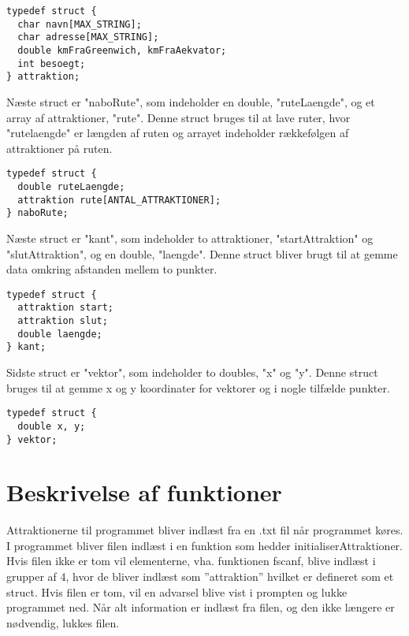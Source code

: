 \begin{lstlisting}
typedef struct {
  char navn[MAX_STRING];
  char adresse[MAX_STRING]; 
  double kmFraGreenwich, kmFraAekvator;
  int besoegt;
} attraktion;
\end{lstlisting} 

Næste struct er "naboRute", som indeholder en double, "ruteLaengde", og et array af attraktioner, "rute". Denne struct bruges til at lave ruter, hvor "rutelaengde" er længden af ruten og arrayet indeholder rækkefølgen af attraktioner på ruten. \newline

\begin{lstlisting}
typedef struct {
  double ruteLaengde;
  attraktion rute[ANTAL_ATTRAKTIONER];
} naboRute;
\end{lstlisting}

Næste struct er "kant", som indeholder to attraktioner, "startAttraktion" og "slutAttraktion", og en double, "laengde". Denne struct bliver brugt til at gemme data omkring afstanden mellem to punkter.\newline

\begin{lstlisting}
typedef struct {
  attraktion start;
  attraktion slut;
  double laengde;
} kant;
\end{lstlisting}

Sidste struct er "vektor", som indeholder to doubles, "x" og "y". Denne struct bruges til at gemme x og y koordinater for vektorer og i nogle tilfælde punkter. \newline

\begin{lstlisting}
typedef struct {
  double x, y;
} vektor;
\end{lstlisting}

\section{Beskrivelse af funktioner}
Attraktionerne til programmet bliver indlæst fra en .txt fil når programmet køres. I programmet bliver filen indlæst i en funktion som hedder initialiserAttraktioner. Hvis filen ikke er tom vil elementerne, vha. funktionen fscanf, blive indlæst i grupper af 4, hvor de bliver indlæst som ”attraktion” hvilket er defineret som et struct. Hvis filen er tom, vil en advarsel blive vist i prompten og lukke programmet ned. Når alt information er indlæst fra filen, og den ikke længere er nødvendig, lukkes filen.\newline

